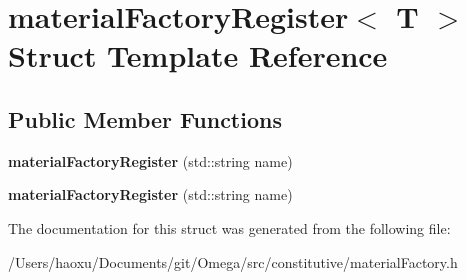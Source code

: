 \hypertarget{structmaterial_factory_register}{}\section{material\+Factory\+Register$<$ T $>$ Struct Template Reference}
\label{structmaterial_factory_register}
\subsection*{Public Member Functions}
\begin{DoxyCompactItemize}
\item 
\mbox{\label{structmaterial_factory_register_a52c18bb7391bd5c52d412ece36ba93c7}} 
{\bfseries material\+Factory\+Register} (std\+::string name)
\item 
\mbox{\label{structmaterial_factory_register_a52c18bb7391bd5c52d412ece36ba93c7}} 
{\bfseries material\+Factory\+Register} (std\+::string name)
\end{DoxyCompactItemize}


The documentation for this struct was generated from the following file\+:\begin{DoxyCompactItemize}
\item 
/\+Users/haoxu/\+Documents/git/\+Omega/src/constitutive/material\+Factory.\+h\end{DoxyCompactItemize}
